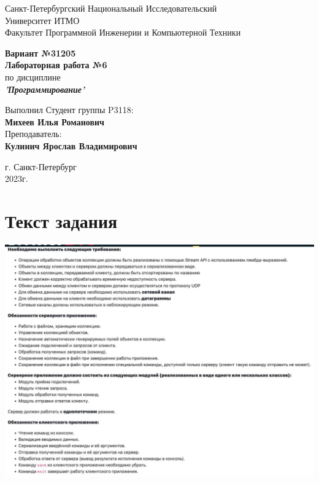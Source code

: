 \documentclass[12pt,onecolumn]{article}
\begin{document}
\begin{center}
    Санкт-Петербургский Национальный Исследовательский\\ 
    Университет ИТМО\\
    Факультет Программной Инженерии и Компьютерной Техники\\
\end{center}
\vspace{1cm}


\begin{center}
    \large \textbf{Вариант №31205}\\
    \textbf{Лабораторная работа №6}\\
    по дисциплине\\
    \textbf{\textit{'Программирование'}}
\end{center}

\vspace{3cm}
\begin{flushright}
  Выполнил Студент  группы P3118: \\
  \textbf{Михеев Илья Романович}\\
  Преподаватель: \\
  \textbf{Кулинич Ярослав Владимирович}\\
\end{flushright}

\vspace{14cm}
\begin{center}
    г. Санкт-Петербург\\
    2023г.
\end{center}

\newpage

\tableofcontents

\vspace{1cm}

\section{Текст задания}
\includegraphics[width=\columnwidth]{imgs/lab6_task1.jpg}
\end{document}
